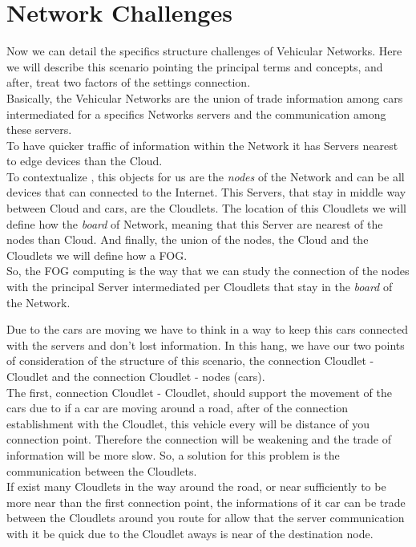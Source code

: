 \documentclass[a4paper]{article}
\begin{document}
\section{Network Challenges}



Now we can detail the specifics structure challenges of Vehicular Networks. Here we will describe this scenario pointing the principal terms and concepts, and after, treat two factors of the settings connection. \\
Basically, the Vehicular Networks are the union of trade information among cars intermediated for a specifics Networks servers and the communication among these servers. \\ 
To have quicker traffic of information within the Network it has Servers nearest to edge devices than the Cloud. \\
To contextualize , this objects for us are the \textit{nodes} of the Network and can be all devices that can connected to the Internet. This Servers, that stay in middle way between Cloud and cars, are the Cloudlets. The location of this Cloudlets we will define how the \textit{board} of Network, meaning that this Server are nearest of the nodes than Cloud. And finally, the union of the nodes, the Cloud and the Cloudlets we will define how a FOG. \\
So, the FOG computing is the way that we can study the connection of the nodes with the principal Server intermediated per Cloudlets that stay in the \textit{board} of the Network.

Due to the cars are moving we have to think in a way to keep this cars connected with the servers and don't lost information. In this hang, we have our two points of consideration of the structure of this scenario, the connection Cloudlet - Cloudlet and the connection Cloudlet - nodes (cars). \\
The first, connection Cloudlet - Cloudlet, should support the movement of the cars due to if a car are moving around a road, after of the connection establishment with the Cloudlet, this vehicle every will be distance of you connection point. Therefore the connection will be weakening and the trade of information will be more slow. So, a solution for this problem is the communication between the Cloudlets. \\
If exist many Cloudlets in the way around the road, or near sufficiently to be more near than the first connection point, the informations of it car can be trade between the Cloudlets around you route for allow that the server communication with it be quick due to the Cloudlet aways is near of the destination node.
\end{document}
